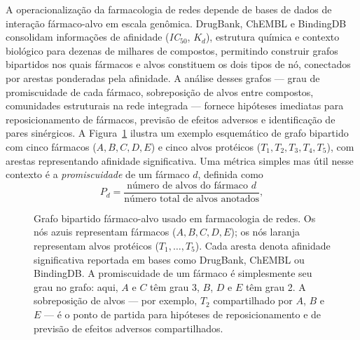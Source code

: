 A operacionalização da farmacologia de redes depende de bases de dados de interação fármaco-alvo em escala genômica. DrugBank, ChEMBL e BindingDB consolidam informações de afinidade (\emph{IC}$_{50}$, $K_d$), estrutura química e contexto biológico para dezenas de milhares de compostos, permitindo construir grafos bipartidos nos quais fármacos e alvos constituem os dois tipos de nó, conectados por arestas ponderadas pela afinidade. A análise desses grafos --- grau de promiscuidade de cada fármaco, sobreposição de alvos entre compostos, comunidades estruturais na rede integrada --- fornece hipóteses imediatas para reposicionamento de fármacos, previsão de efeitos adversos e identificação de pares sinérgicos. A Figura~\ref{fig:13-bipartido} ilustra um exemplo esquemático de grafo bipartido com cinco fármacos ($A, B, C, D, E$) e cinco alvos protéicos ($T_1, T_2, T_3, T_4, T_5$), com arestas representando afinidade significativa. Uma métrica simples mas útil nesse contexto é a \emph{promiscuidade} de um fármaco $d$, definida como
\begin{equation*}
P_d = \frac{\text{número de alvos do fármaco } d}{\text{número total de alvos anotados}},
\end{equation*}

\begin{figure}[ht]
\centering
{}
\caption{Grafo bipartido fármaco-alvo usado em farmacologia de redes. Os nós azuis representam fármacos ($A, B, C, D, E$); os nós laranja representam alvos protéicos ($T_1, \ldots, T_5$). Cada aresta denota afinidade significativa reportada em bases como DrugBank, ChEMBL ou BindingDB. A promiscuidade de um fármaco é simplesmente seu grau no grafo: aqui, $A$ e $C$ têm grau 3, $B$, $D$ e $E$ têm grau 2. A sobreposição de alvos --- por exemplo, $T_2$ compartilhado por $A$, $B$ e $E$ --- é o ponto de partida para hipóteses de reposicionamento e de previsão de efeitos adversos compartilhados.}
\label{fig:13-bipartido}
\end{figure}

